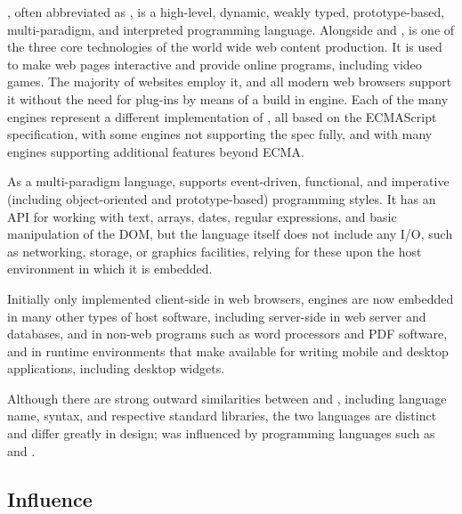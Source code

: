 \documentclass[../Languages.tex]{subfiles}
\begin{document}
\label{sec:javascript}

, often abbreviated as , is a high-level, dynamic, weakly
typed, prototype-based, multi-paradigm, and interpreted programming language.
Alongside  and ,  is one of the three core
technologies of the world wide web content production. It is used to make
web pages interactive and provide online programs, including video games. The
majority of websites employ it, and all modern web browsers support it without
the need for plug-ins by means of a build in  engine. Each of
the many  engines represent a different implementation of
, all based on the ECMAScript specification, with some engines
not supporting the spec fully, and with many engines supporting additional
features beyond ECMA.

As a multi-paradigm language,  supports event-driven,
functional, and imperative (including object-oriented and prototype-based)
programming styles. It has an API for working with text, arrays, dates, regular
expressions, and basic manipulation of the DOM, but the language itself does
not include any I/O, such as networking, storage, or graphics facilities,
relying for these upon the host environment in which it is embedded.

Initially only implemented client-side in web browsers,  engines
are now embedded in many other types of host software, including server-side in
web server and databases, and in non-web programs such as word processors and
PDF software, and in runtime environments that make  available
for writing mobile and desktop applications, including desktop widgets.

Although there are strong outward similarities between  and
, including language name, syntax, and respective standard libraries,
the two languages are distinct and differ greatly in design; 
was influenced by programming languages such as  and .

\subsection{Influence}\label{sub:influence}
\end{document}
